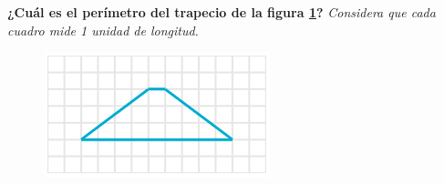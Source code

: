 \begin{multicols}{2}
\textbf{¿Cuál es el perímetro del trapecio de la figura \ref{fig:peri_trap_03}?}
\emph{Considera que cada cuadro mide 1 unidad de longitud.}


\begin{figure}[H]
    \centering
    \includegraphics[width=0.6\linewidth]{../images/peri_trap_03}
    \caption{}
    \label{fig:peri_trap_03}
\end{figure}
\end{multicols}
